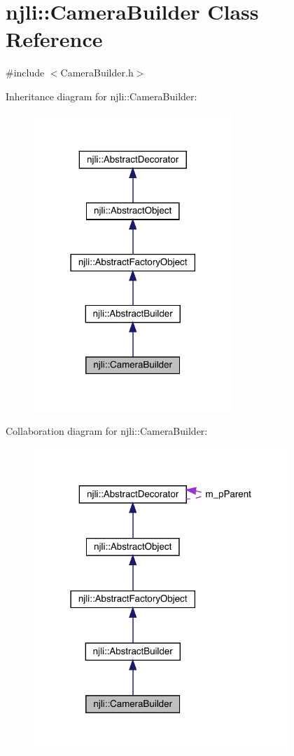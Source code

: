 \hypertarget{classnjli_1_1_camera_builder}{}\section{njli\+:\+:Camera\+Builder Class Reference}
\label{classnjli_1_1_camera_builder}


{\ttfamily \#include $<$Camera\+Builder.\+h$>$}



Inheritance diagram for njli\+:\+:Camera\+Builder\+:\nopagebreak
\begin{figure}[H]
\begin{center}
\leavevmode
\includegraphics[width=213pt]{classnjli_1_1_camera_builder__inherit__graph}
\end{center}
\end{figure}


Collaboration diagram for njli\+:\+:Camera\+Builder\+:\nopagebreak
\begin{figure}[H]
\begin{center}
\leavevmode
\includegraphics[width=273pt]{classnjli_1_1_camera_builder__coll__graph}
\end{center}
\end{figure}
